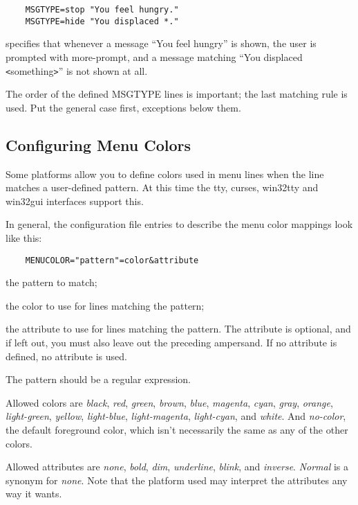 \begin{verbatim}
    MSGTYPE=stop "You feel hungry."
    MSGTYPE=hide "You displaced *."
\end{verbatim}

specifies that whenever a message ``You feel hungry'' is shown,
the user is prompted with more-prompt, and a message matching
``You displaced  \verb+<+something\verb+>+'' is not shown at all.

The order of the defined MSGTYPE lines is important; the last matching
rule is used. Put the general case first, exceptions below them.


\subsection*{Configuring Menu Colors}

Some platforms allow you to define colors used in menu lines when the
line matches a user-defined pattern.
At this time the tty, curses, win32tty and
win32gui interfaces support this.

In general, the configuration file entries to describe the menu color mappings
look like this:
\begin{verbatim}
    MENUCOLOR="pattern"=color&attribute
\end{verbatim}

\blist{}
\item[\ib{pattern}]
the pattern to match;
\item[\ib{color}]
the color to use for lines matching the pattern;
\item[\ib{attribute}]
the attribute to use for lines matching the pattern. The attribute is
optional, and if left out, you must also leave out the preceding ampersand.
If no attribute is defined, no attribute is used.
\elist

The pattern should be a regular expression.

Allowed colors are {\it black}, {\it red}, {\it green}, {\it brown},
{\it blue}, {\it magenta}, {\it cyan}, {\it gray}, {\it orange},
{\it light-green}, {\it yellow}, {\it light-blue}, {\it light-magenta},
{\it light-cyan}, and {\it white}.
And {\it no-color}, the default foreground color, which isn't necessarily
the same as any of the other colors.

Allowed attributes are {\it none}, {\it bold}, {\it dim}, {\it underline},
{\it blink}, and {\it inverse}.
{\it Normal\/} is a synonym for {\it none}.
Note that the platform used may interpret the attributes any way it
wants.

